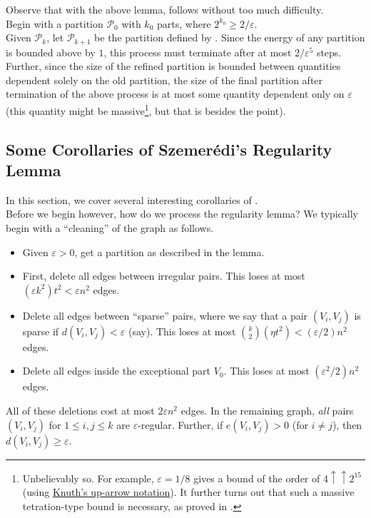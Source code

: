			Observe that with the above lemma,  follows without too much difficulty.\\
			Begin with a partition $\mathcal{P}_0$ with $k_0$ parts, where $2^{k_0} \ge 2/\varepsilon$.\\
			Given $\mathcal{P}_k$, let $\mathcal{P}_{k+1}$ be the partition defined by . Since the energy of any partition is bounded above by $1$, this process must terminate after at most $2/\varepsilon^5$ steps.\\
			Further, since the size of the refined partition is bounded between quantities dependent solely on the old partition, the size of the final partition after termination of the above process is at most some quantity dependent only on $\varepsilon$ (this quantity might be massive\footnote{Unbelievably so. For example, $\varepsilon=1/8$ gives a bound of the order of $4\uparrow\uparrow 2^{15}$ (using \href{https://en.wikipedia.org/wiki/Knuths_up-arrow_notation}{Knuth's up-arrow notation}). It further turns out that such a massive tetration-type bound is necessary, as proved in \cite{Gowers1997}.}, but that is besides the point).\\

	\subsection{Some Corollaries of Szemer\'{e}di's Regularity Lemma}

		In this section, we cover several interesting corollaries of .\\

		Before we begin however, how do we process the regularity lemma? We typically begin with a ``cleaning'' of the graph as follows.
		\begin{itemize}
			\item Given $\varepsilon > 0$, get a partition as described in the lemma.
			\item First, delete all edges between irregular pairs. This loses at most $(\varepsilon k^2) t^2 < \varepsilon n^2$ edges.
			\item Delete all edges between ``sparse'' pairs, where we say that a pair $(V_i,V_j)$ is sparse if $d(V_i,V_j) < \varepsilon$ (say). This loses at most $\binom{k}{2} (\eta t^2) < (\varepsilon/2)n^2$ edges.
			\item Delete all edges inside the exceptional part $V_0$. This loses at most $(\varepsilon^2/2)n^2$ edges. 
		\end{itemize}
		All of these deletions cost at most $2\varepsilon n^2$ edges. In the remaining graph, \emph{all} pairs $(V_i,V_j)$ for $1 \le i,j\le k$ are $\varepsilon$-regular. Further, if $e(V_i,V_j) > 0$ (for $i\ne j$), then $d(V_i,V_j) \ge \varepsilon$.\\

